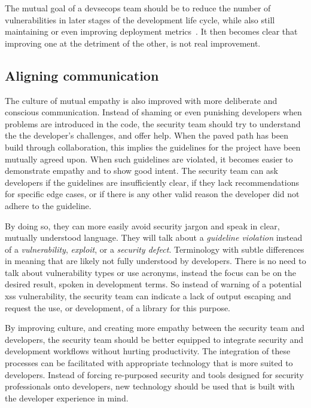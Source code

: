 The mutual goal of a \gls{devsecops} team should be to reduce the number of vulnerabilities in later stages of the development life cycle, while also still maintaining or even improving deployment metrics~\cite{doddevsecops}.
It then becomes clear that improving one at the detriment of the other, is not real improvement.

\subsection{Aligning communication}
\label{sec:communication}
The culture of mutual empathy is also improved with more deliberate and conscious communication.
Instead of shaming or even punishing developers when problems are introduced in the code, the security team should try to understand the the developer's challenges, and offer help.
When the paved path has been build through collaboration, this implies the guidelines for the project have been mutually agreed upon.
When such guidelines are violated, it becomes easier to demonstrate empathy and to show good intent.
The security team can ask developers if the guidelines are insufficiently clear, if they lack recommendations for specific edge cases, or if there is any other valid reason the developer did not adhere to the guideline.

By doing so, they can more easily avoid security jargon and speak in clear, mutually understood language.
They will talk about a \textit{guideline violation} instead of a \textit{\gls{vulnerability}}, \textit{\gls{exploit}}, or a \textit{\gls{security defect}}.
Terminology with subtle differences in meaning that are likely not fully understood by developers.
There is no need to talk about \gls{vulnerability} types or use acronyms, instead the focus can be on the desired result, spoken in development terms.
So instead of warning of a potential \gls{xss} \gls{vulnerability}, the security team can indicate a lack of output escaping and request the use, or development, of a library for this purpose.

By improving culture, and creating more empathy between the security team and developers, the security team should be better equipped to integrate security and development workflows without hurting productivity.
The integration of these processes can be facilitated with appropriate technology that is more suited to developers.
Instead of forcing re-purposed security and tools designed for security professionals onto developers, new technology should be used that is built with the developer experience in mind.

